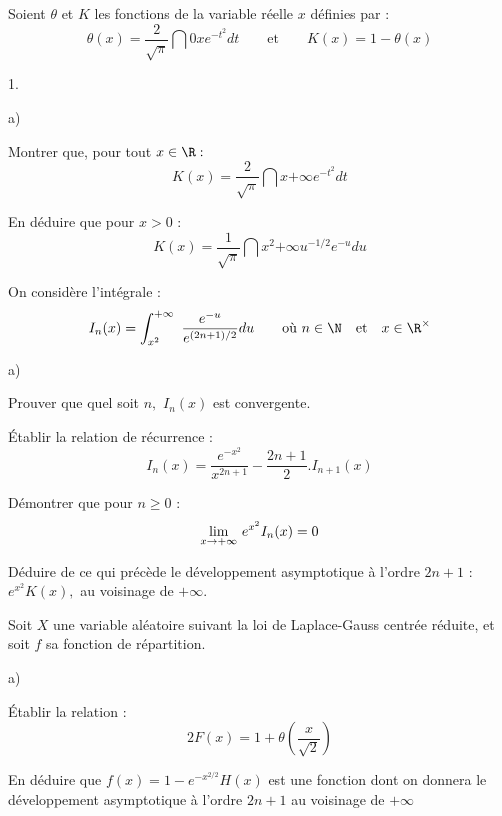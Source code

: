 \documentclass[11pt]{article}%
\begin{document}
Soient $\theta $ et $K$ les fonctions de la variable réelle $x$
définies par :
\[
\theta (x) = \dfrac{2}{\sqrt{\pi }}\dint{0}{x}e^{-t^{2}}dt\qquad
\text{et}\qquad K(x) = 1-\theta (x)
\]

\begin{noliste}{1.}
 \setlength{\itemsep}{4mm}
\item 

\begin{noliste}{a)}
 \setlength{\itemsep}{2mm}
\item Montrer que, pour tout $x\in \R :$
\[
K(x) = \dfrac{2}{\sqrt{\pi }}\dint{x}{+ \infty }e^{-t^{2}}dt
\]

\item En déduire que pour $x>0$ :
\[
K(x) = \dfrac{1}{\sqrt{\pi }}\dint{x^{2}}{+ \infty }u^{-1/2}e^{-u}du
\]
\end{noliste}

\item On considère l'intégrale :
\[
I_{n}(x) = \dint{x^{2}}{+ \infty }\dfrac{e^{-u}}{e^{(2n +
1)/2}}du\qquad 
\text{où }n\in \N\quad \text{et}\quad x\in \R^{\times }
\]

\begin{noliste}{a)}
 \setlength{\itemsep}{2mm}
\item Prouver que quel soit $n,$ $I_{n}(x)$ est convergente.

\item Établir la relation de récurrence :
\[
I_{n}(x) = \dfrac{e^{-x^{2}}}{x^{2n + 1}}-\dfrac{2n + 1}{2}.I_{n +
1}(x)
\]

\item Démontrer que pour $n\geq 0$ :
\[
{\displaystyle \lim_{x\rightarrow + \infty } \ }e^{x^{2}}I_{n}(x) = 0
\]
\end{noliste}

\item Déduire de ce qui précède le développement asymptotique à l'ordre
$2n + 1 $ : $e^{x^{2}}K(x),$ au voisinage de $ + \infty.$

\item Soit $X$ une variable aléatoire suivant la loi de Laplace-Gauss
centrée réduite, et soit $f$ sa fonction de répartition.

\begin{noliste}{a)}
 \setlength{\itemsep}{2mm}
\item Établir la relation :
\[
2F(x) = 1 + \theta (\dfrac{x}{\sqrt{2}})
\]

\item En déduire que $f(x) = 1-e^{-x^{2/2}}H(x)$ est une fonction dont
on
donnera le développement asymptotique à l'ordre $2n + 1$ au voisinage
de $ + \infty $
\end{noliste}
\end{noliste}

\label{fin}
\end{document}
